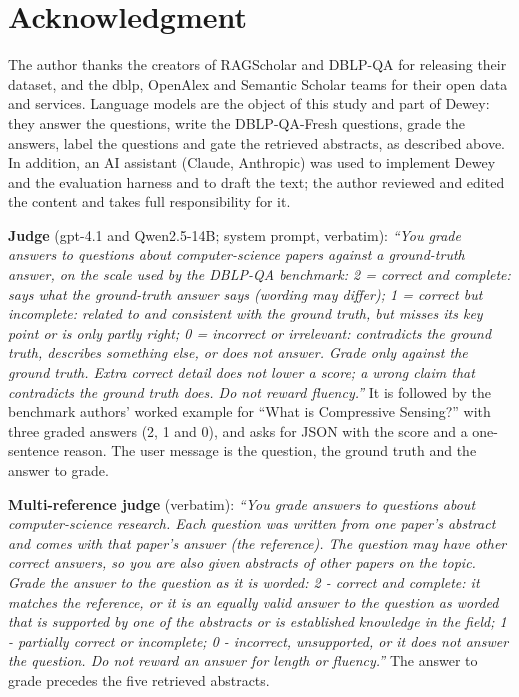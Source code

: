 \documentclass[conference]{IEEEtran}
\newcommand{\fresh}{DBLP-QA-Fresh}
\begin{document}
\section*{Acknowledgment}

The author thanks the creators of RAGScholar and DBLP-QA for releasing their dataset, and the dblp,
OpenAlex and Semantic Scholar teams for their open data and services. Language models are the object of
this study and part of Dewey: they answer the questions, write the \fresh{} questions, grade the answers,
label the questions and gate the retrieved abstracts, as described above. In addition, an AI assistant
(Claude, Anthropic) was used to implement Dewey and the evaluation harness and to draft the text; the
author reviewed and edited the content and takes full responsibility for it.

\IEEEtriggercmd{\enlargethispage{2\baselineskip}}



\appendix[Prompts]
\label{app:prompts}

\textbf{Judge} (gpt-4.1 and Qwen2.5-14B; system prompt, verbatim): \emph{``You grade answers to questions
about computer-science papers against a ground-truth answer, on the scale used by the DBLP-QA benchmark:
2 = correct and complete: says what the ground-truth answer says (wording may differ); 1 = correct but
incomplete: related to and consistent with the ground truth, but misses its key point or is only partly
right; 0 = incorrect or irrelevant: contradicts the ground truth, describes something else, or does not
answer. Grade only against the ground truth. Extra correct detail does not lower a score; a wrong claim
that contradicts the ground truth does. Do not reward fluency.''} It is followed by the benchmark
authors' worked example for ``What is Compressive Sensing?'' with three graded answers (2, 1 and 0), and
asks for JSON with the score and a one-sentence reason. The user message is the question, the ground
truth and the answer to grade.

\textbf{Multi-reference judge} (verbatim): \emph{``You grade answers to questions about computer-science
research. Each question was written from one paper's abstract and comes with that paper's answer (the
reference). The question may have other correct answers, so you are also given abstracts of other papers
on the topic. Grade the answer to the question as it is worded: 2 - correct and complete: it matches the
reference, or it is an equally valid answer to the question as worded that is supported by one of the
abstracts or is established knowledge in the field; 1 - partially correct or incomplete; 0 - incorrect,
unsupported, or it does not answer the question. Do not reward an answer for length or fluency.''} The
answer to grade precedes the five retrieved abstracts.
\end{document}
